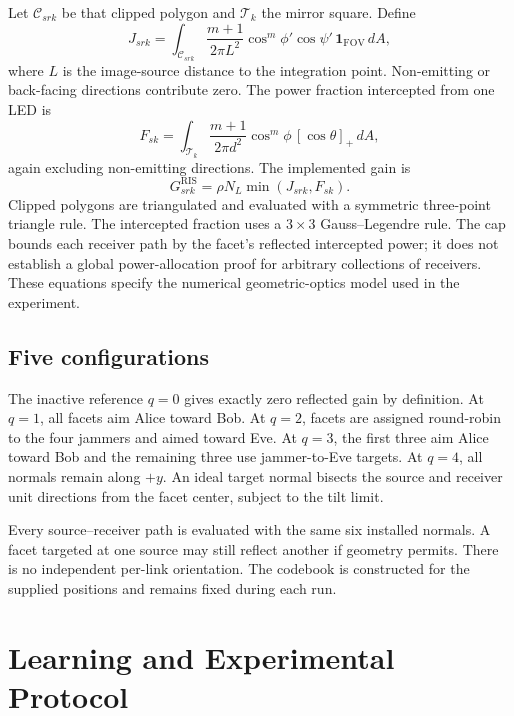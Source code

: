 \documentclass[journal,10pt,twocolumn]{IEEEtran}
\begin{document}
Let $\mathcal{C}_{srk}$ be that clipped polygon and $\mathcal{T}_k$ the mirror square. Define
\begin{equation}
J_{srk}=\int_{\mathcal{C}_{srk}}\frac{m+1}{2\pi L^2}
\cos^m\phi'\cos\psi'\,\mathbf{1}_{\mathrm{FOV}}\,dA,

\end{equation}
where $L$ is the image-source distance to the integration point. Non-emitting or back-facing directions contribute zero. The power fraction intercepted from one LED is
\begin{equation}
F_{sk}=\int_{\mathcal{T}_k}\frac{m+1}{2\pi d^2}
\cos^m\phi\,[\cos\theta]_+\,dA,

\end{equation}
again excluding non-emitting directions. The implemented gain is
\begin{equation}
G_{srk}^{\mathrm{RIS}}=\rho N_L\min(J_{srk},F_{sk}).

\end{equation}
Clipped polygons are triangulated and evaluated with a symmetric three-point triangle rule. The intercepted fraction uses a $3\times3$ Gauss--Legendre rule. The cap bounds each receiver path by the facet's reflected intercepted power; it does not establish a global power-allocation proof for arbitrary collections of receivers. These equations specify the numerical geometric-optics model used in the experiment.

\subsection{Five configurations}
The inactive reference $q=0$ gives exactly zero reflected gain by definition. At $q=1$, all facets aim Alice toward Bob. At $q=2$, facets are assigned round-robin to the four jammers and aimed toward Eve. At $q=3$, the first three aim Alice toward Bob and the remaining three use jammer-to-Eve targets. At $q=4$, all normals remain along $+y$. An ideal target normal bisects the source and receiver unit directions from the facet center, subject to the tilt limit.

Every source--receiver path is evaluated with the same six installed normals. A facet targeted at one source may still reflect another if geometry permits. There is no independent per-link orientation. The codebook is constructed for the supplied positions and remains fixed during each run.

\section{Learning and Experimental Protocol}
\end{document}
